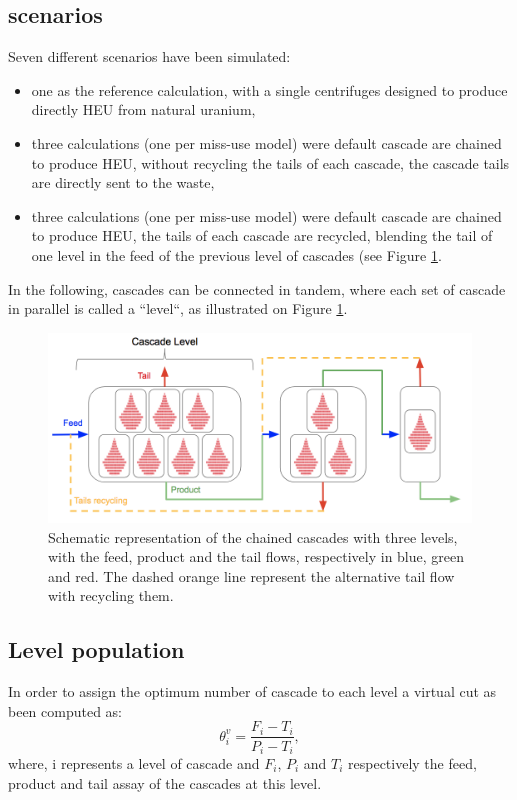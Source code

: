 \subsection{scenarios}
Seven different scenarios have been simulated:
\begin{itemize}
\item one as the reference calculation, with a single centrifuges designed to
    produce directly \gls{HEU} from natural uranium,
\item three calculations (one per miss-use model) were default cascade are
    chained to produce \gls{HEU}, without recycling the tails of each cascade,
    the cascade tails are directly sent to the waste,
\item three calculations (one per miss-use model) were default cascade are
    chained to produce \gls{HEU}, the tails of each cascade are recycled, blending
    the tail of one level in the feed of the previous level of
    cascades (see Figure \ref{fig:cascade_level}.
\end{itemize}
In the following, cascades can be connected in tandem, where each set of cascade
in parallel is called a ``level``, as illustrated on Figure
\ref{fig:cascade_level}.

\begin{figure}[ht] %
    \centering
    \includegraphics[scale=0.45]{flow}
    \caption{Schematic representation of the chained cascades with three levels,
    with the feed, product and the tail flows, respectively in blue, green and
    red. The dashed orange line represent the alternative tail flow with
    recycling them.}
    \label{fig:cascade_level}
\end{figure}


\subsection{Level population}
In order to assign the optimum number of cascade to each level a virtual cut as
been computed as:
\begin{equation}
    \theta^{v}_{i} = \frac{F_{i}-T_{i}}{P_{i}-T_{i}},
\end{equation}
where, i represents a level of cascade and $F_{i}$, $P_{i}$ and $T_{i}$
respectively the feed, product and tail assay of the cascades at this level.

